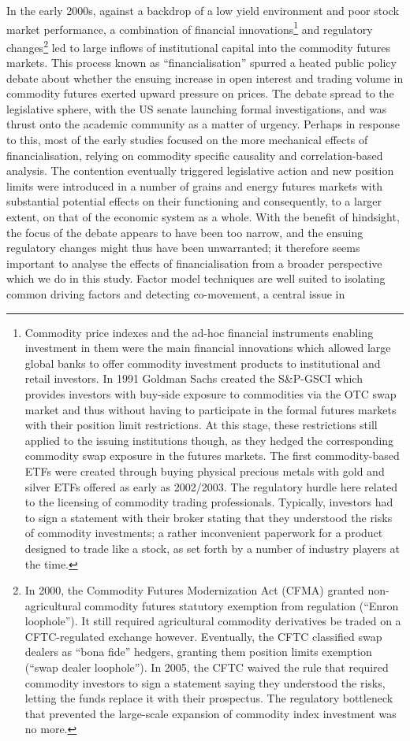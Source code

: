 \documentclass[]{elsarticle} %
\begin{document}
In the early 2000s, against a backdrop of a low yield environment and poor stock market performance, a combination of financial innovations\footnote{Commodity price indexes and the ad-hoc financial instruments enabling investment in them were the main financial innovations which allowed large global banks to offer commodity investment products to institutional and retail investors. In 1991 Goldman Sachs created the S\&P-GSCI which provides investors with buy-side exposure to commodities via the OTC swap market and thus without having to participate in the formal futures markets with their position limit restrictions. At this stage, these restrictions still applied to the issuing institutions though, as they hedged the corresponding commodity swap exposure in the futures markets. The first commodity-based ETFs were created through buying physical precious metals with gold and silver ETFs offered as early as 2002/2003. The regulatory hurdle here related to the licensing of commodity trading professionals. Typically, investors had to sign a statement with their broker stating that they understood the risks of commodity investments; a rather inconvenient paperwork for a product designed to trade like a stock, as set forth by a number of industry players at the time.} and regulatory changes\footnote{In 2000, the Commodity Futures Modernization Act (CFMA) granted non-agricultural commodity futures statutory exemption from regulation (``Enron loophole''). It still required agricultural commodity derivatives be traded on a CFTC-regulated exchange however. Eventually, the CFTC classified swap dealers as ``bona fide'' hedgers, granting them position limits exemption (``swap dealer loophole''). In 2005, the CFTC waived the rule that required commodity investors to sign a statement saying they understood the risks, letting the funds replace it with their prospectus. The regulatory bottleneck that prevented the large-scale expansion of commodity index investment was no more.} led to large inflows of institutional capital into the commodity futures markets. This process known as ``financialisation'' spurred a heated public policy debate about whether the ensuing increase in open interest and trading volume in commodity futures exerted upward pressure on prices. The debate spread to the legislative sphere, with the US senate launching formal investigations, and was thrust onto the academic community as a matter of urgency. Perhaps in response to this, most of the early studies focused on the more mechanical effects of financialisation, relying on commodity specific causality and correlation-based analysis. The contention eventually triggered legislative action and new position limits were introduced in a number of grains and energy futures markets with substantial potential effects on their functioning and consequently, to a larger extent, on that of the economic system as a whole. With the benefit of hindsight, the focus of the debate appears to have been too narrow, and the ensuing regulatory changes might thus have been unwarranted; it therefore seems important to analyse the effects of financialisation from a broader perspective which we do in this study. Factor model techniques are well suited to isolating common driving factors and detecting co-movement, a central issue in 
\end{document}
